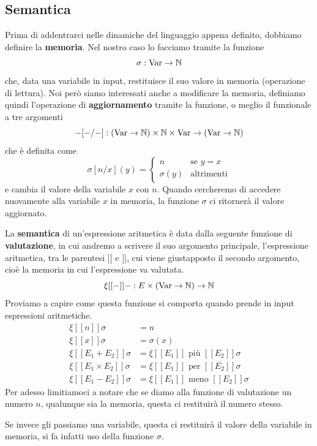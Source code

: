 \subsection{Semantica}
Prima di addentrarci nelle dinamiche del linguaggio appena
definito, dobbiamo definire la \textbf{memoria}. Nel nostro
caso lo facciamo tramite la funzione
\[ \sigma : \operatorname{Var} \to \mathbb{N} \]
che, data una variabile in input, restituisce il suo valore
in memoria (operazione di lettura). Noi però siamo interessati
anche a modificare la memoria, definiamo quindi l'operazione
di \textbf{aggiornamento} tramite la funzione, o meglio il
funzionale a tre argomenti
\[
	- [ - / - ] : (\operatorname{Var} \to \mathbb{N}) \times
	\mathbb{N} \times \operatorname{Var} \to (\operatorname{Var} \to \mathbb{N})
\]
che è definita come
\[
	\sigma [n / x](y) = \begin{cases}
		n         & \text{se } y = x  \\
		\sigma(y) & \text{altrimenti}
	\end{cases}
\]
e cambia il valore della variabile $x$ con $n$. Quando 
cercheremo di accedere nuovamente alla variabile $x$ in 
memoria, la funzione $\sigma$ ci ritornerà il valore aggiornato.

La \textbf{semantica} di un'espressione aritmetica è data
dalla seguente funzione di \textbf{valutazione}, in cui andremo
a scrivere il suo argomento principale, l'espressione aritmetica,
tra le parentesi $[[$ e $]]$, cui viene giustapposto il secondo
argomento, cioè la memoria in cui l'espressione va valutata.
\[ \xi [[-]] - : E \times (\operatorname{Var} \to \mathbb{N}) \to \mathbb{N} \]
Proviamo a capire come questa funzione si comporta quando
prende in input espressioni aritmetiche.
\begin{align*}
	\xi [[n]] \sigma              & = n         \\
	\xi [[x]] \sigma              & = \sigma(x) \\
	\xi [[E_1 + E_2]] \sigma      &
	= \xi [[E_1]] \text{ più } [[E_2]] \sigma   \\
	\xi [[E_1 \times E_2]] \sigma &
	= \xi [[ E_1 ]] \text{ per } [[E_2]] \sigma \\
	\xi [[E_1 - E_2]] \sigma      &
	= \xi [[ E_1 ]] \text{ meno } [[E_2]] \sigma
\end{align*}
Per adesso limitiamoci a notare che se diamo alla funzione di
valutazione un numero $n$, qualunque sia la memoria, questa
ci restituirà il numero stesso.

Se invece gli passiamo una variabile, questa ci restituirà
il valore della variabile in memoria, si fa infatti uso della
funzione $\sigma$.

